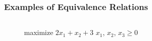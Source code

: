 \documentclass[aspectratio = 169]{beamer}
\begin{document}
\begin{frame}
  \frametitle{Examples of Equivalence Relations}
  \begin{columns}
    \begin{column}{.55\textwidth}
      \begin{figure}
        \begin{linearProg}{
            maximize
          }{
            $2x_1 + x_2 + 3$
          }{
          }{
            $x_1$, $x_2$, $x_3 \geq 0$
          }
        \end{linearProg}
      \end{figure}
    \end{column}
    \vrule{}

    \quad
    \begin{column}{.55\textwidth}
      \begin{overlayarea}{\textwidth}{.55\textheight}


\end{overlayarea}
\end{column}
\end{columns}
\end{frame}
\end{document}
